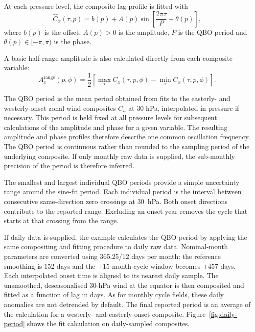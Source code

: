 \documentclass[11pt,a4paper]{article}
\begin{document}
At each pressure level, the composite lag profile is fitted with
\begin{equation}
\widehat{C}_x(\tau,p)=b(p)+A(p)\sin\!\left[
\frac{2\pi\tau}{P}+\theta(p)\right],
\end{equation}
where $b(p)$ is the offset, $A(p)>0$ is the amplitude, $P$ is the QBO period
and $\theta(p)\in[-\pi,\pi)$ is the phase.

A basic half-range amplitude is also calculated directly from each
composite variable:
\begin{equation}
A_x^{\mathrm{range}}(p,\phi)=\frac{1}{2}\left[
\max_\tau C_x(\tau,p,\phi)-\min_\tau C_x(\tau,p,\phi)\right].
\end{equation}

The QBO period is the mean period obtained from fits to the easterly- and westerly-onset zonal wind composites
$C_u$ at 30 hPa, interpolated in pressure if necessary. This period is held fixed at all pressure levels for
subsequent calculations of the amplitude and phase for a given variable. The resulting amplitude and phase
profiles therefore describe one common oscillation frequency. The QBO period is continuous rather than rounded
to the sampling period of the underlying composite. If only monthly raw data is supplied, the sub-monthly
precision of the period is therefore inferred. 

The smallest and largest individual QBO periods provide a simple uncertainty
range around the sine-fit period.  Each individual period is the interval
between consecutive same-direction zero crossings at 30~hPa.  Both onset
directions contribute to the reported range.  Excluding an onset year removes
the cycle that starts at that crossing from the range.

If daily data is supplied, the example calculates the QBO period by applying the same compositing and
fitting procedure to daily raw data.  Nominal-month parameters are converted using 365.25/12 days per month:
the reference smoothing is 152 days and the $\pm15$-month cycle window becomes $\pm457$ days.  Each
interpolated onset time is aligned to its nearest daily sample.  The unsmoothed, deseasonalised 30-hPa wind
at the equator is then composited and fitted as a function of lag in days. As
for monthly cycle fields, these daily anomalies are not detrended by default.
The final reported period is an average of the calculation for a
westerly- and easterly-onset composite. Figure~\ref{fig:daily-period} shows the fit calculation on
daily-sampled composites.
\end{document}
